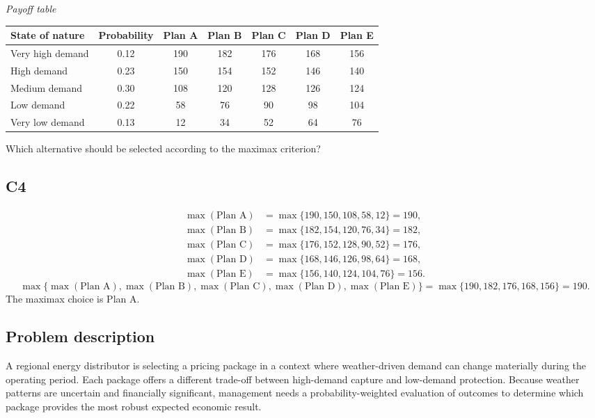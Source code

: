 \begin{ExamProblems}
		\begin{center}
			\textit{Payoff table} \par
			\begin{tabular}{l c c c c c c}
				\toprule
				State of nature & Probability & Plan A & Plan B & Plan C & Plan D & Plan E \\
				\midrule
				Very high demand & 0.12 & 190 & 182 & 176 & 168 & 156 \\
				High demand & 0.23 & 150 & 154 & 152 & 146 & 140 \\
				Medium demand & 0.30 & 108 & 120 & 128 & 126 & 124 \\
				Low demand & 0.22 & 58 & 76 & 90 & 98 & 104 \\
				Very low demand & 0.13 & 12 & 34 & 52 & 64 & 76 \\
				\bottomrule
			\end{tabular}
		\end{center}

		Which alternative should be selected according to the maximax criterion?

		\subsection*{C4}
		\[
		\begin{aligned}
		\max(\text{Plan A}) &= \max\{190,150,108,58,12\} = 190,\\
		\max(\text{Plan B}) &= \max\{182,154,120,76,34\} = 182,\\
		\max(\text{Plan C}) &= \max\{176,152,128,90,52\} = 176,\\
		\max(\text{Plan D}) &= \max\{168,146,126,98,64\} = 168,\\
		\max(\text{Plan E}) &= \max\{156,140,124,104,76\} = 156.
		\end{aligned}
		\]
		\[
		\max\{\max(\text{Plan A}),\max(\text{Plan B}),\max(\text{Plan C}),\max(\text{Plan D}),\max(\text{Plan E})\}
		= \max\{190,182,176,168,156\}
		= 190.
		\]
		The maximax choice is Plan A.
		\item
		\subsection*{Problem description}
		A regional energy distributor is selecting a pricing package in a context where weather-driven demand can change materially during the operating period. Each package offers a different trade-off between high-demand capture and low-demand protection. Because weather patterns are uncertain and financially significant, management needs a probability-weighted evaluation of outcomes to determine which package provides the most robust expected economic result.


\end{ExamProblems}
